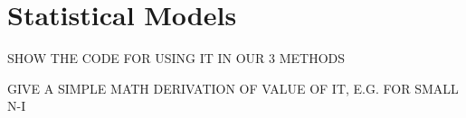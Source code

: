 \chapter{Statistical Models}  
\label{chap:mixed} 

SHOW THE CODE FOR USING IT IN OUR 3 METHODS

GIVE A SIMPLE MATH DERIVATION OF VALUE OF IT, E.G. FOR SMALL N-I

